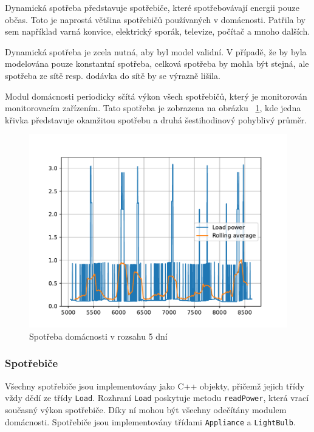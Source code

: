\documentclass[12pt,a4paper]{article}
\begin{document}
Dynamická spotřeba představuje spotřebiče, které spotřebovávají energii pouze občas.
Toto je naprostá většina spotřebičů používaných v domácnosti.
Patřila by sem například varná konvice, elektrický sporák, televize, počítač a mnoho dalších.

Dynamická spotřeba je zcela nutná, aby byl model validní.
V případě, že by byla modelována pouze konstantní spotřeba,
celková spotřeba by mohla být stejná, ale spotřeba ze sítě resp. dodávka do sítě by se výrazně lišila.

Modul domácnosti periodicky sčítá výkon všech spotřebičů, který je monitorován monitorovacím zařízením.
Tato spotřeba je zobrazena na obrázku ~\ref{fig:load_power},
kde jedna křivka představuje okamžitou spotřebu a druhá šestihodinový pohyblivý průměr.

\begin{figure}
\includegraphics[width=\linewidth]{img/load_power.pdf}
\caption{Spotřeba domácnosti v rozsahu 5 dní}
\label{fig:load_power}
\end{figure}

\subsubsection{Spotřebiče}
Všechny spotřebiče jsou implementovány jako C++ objekty, přičemž jejich třídy vždy dědí ze třídy \texttt{Load}.
Rozhraní \texttt{Load} poskytuje metodu \texttt{readPower}, která vrací současný výkon spotřebiče.
Díky ní mohou být všechny odečítány modulem domácnosti.
Spotřebiče jsou implementovány třídami \texttt{Appliance} a \texttt{LightBulb}.
\end{document}
